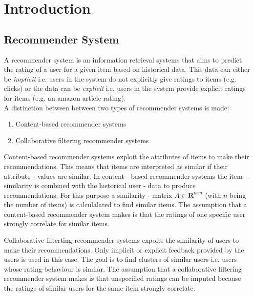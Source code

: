 


\section{Introduction}\raggedbottom

\subsection{Recommender System}
A recommender system is an information retrieval systems that aims to predict the rating of a user for a given item based on 
historical data.
This data can either be \textit{implicit} i.e. users in the system do not explicitly give ratings to items (e.g. clicks) or the data
can be \textit{explicit} i.e. users in the system provide explicit ratings for items (e.g. an amazon article rating).
\\
A distinction between between two types of recommender systems is made:
\begin{enumerate}
    \item Content-based recommender systems 
    \item Collaborative filtering recommender systems
\end{enumerate}

Content-based recommender systems exploit the attributes of items to make their recommendations.
This means that items are interpreted as similar if their attribute - values are similar. 
In content - based recommender systems the item - similarity is combined with the historical user - data to produce recommendations.
For this purpose a similarity - matrix \boldmath${A} \in \mathbf{R}^{nxn}$ (with $n$ being the number of items) is calculalated to find
similar items. The assumption that a content-based recommender system makes is that the ratings of one specific user strongly
correlate for similar items.

Collaborative filterting recommender systems expoits the similarity of users to make their recommendations. Only
implicit or explicit feedback provided by the users is used in this case. The goal is to find clusters of similar users i.e.
users whose rating-behaviour is similar. The assumption that a collaborative filtering recommender system makes is that
unspecified ratings can be imputed because the ratings of similar users for the same item strongly correlate.

